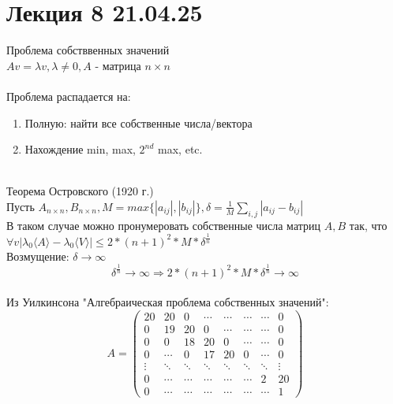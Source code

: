 \section{Лекция 8 21.04.25}
Проблема собстввенных значений
\\
\(Av = \lambda v, \lambda \ne 0, A\) - матрица \({n \times n}\)
\\
\\
Проблема распадается на:
\begin{enumerate}
    \item Полную: найти все собственные числа/вектора 
    \item Нахождение min, max,  \(2^{nd}\) max, etc.
\end{enumerate}
\\
Теорема Островского (1920 г.)  \\
Пусть \(A_{n \times n}, B_{n \times n}, M = max\{ |a_{ij}|, |b_{ij}|\}, \delta = \frac{1}{M}\sum_{i,j}|a_{ij} - b_{ij}|\) \\
В таком случае можно пронумеровать собственные числа матриц \(A, B\) так, что \(\forall v |\lambda_0\langle A \rangle - \lambda_0\langle V \rangle| \leq 2 * (n+1)^2 *M * \delta^{\frac{1}{n}} \) \\
Возмущение: \(\delta \rightarrow \infty\) \\
\[\delta^{\frac{1}{n}} \rightarrow \infty \Rightarrow 2 * (n+1)^2 *M * \delta^{\frac{1}{n}} \rightarrow \infty \] \\
Из Уилкинсона "Алгебраическая проблема собственных значений": \\
    \[
    A = 
    \begin{pmatrix}
    20 & 20 & 0 &\cdots & \cdots &\cdots & \cdots &0  \\
    0 & 19 & 20 & 0 & \cdots &\cdots  & \cdots & 0\\
    0 & 0 & 18 & 20 & 0 &\cdots & \cdots & 0\\
    0 &\cdots& 0 & 17 & 20 & 0 & \cdots & 0\\
    \vdots & \ddots & \ddots & \ddots & \ddots & \ddots & \ddots & \vdots \\

    0 & \cdots & \cdots & \cdots & \cdots & \cdots & 2 & 20 \\
    0 & \cdots & \cdots & \cdots & \cdots & \cdots & \cdots & 1
    \end{pmatrix}
    \]

